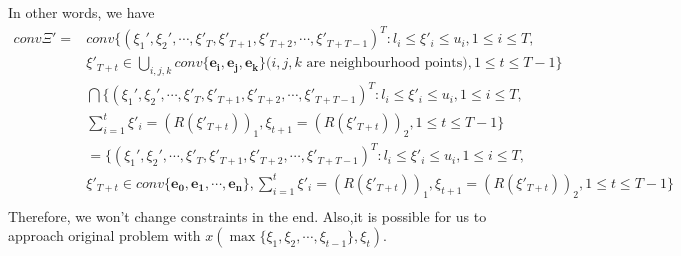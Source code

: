 \documentclass{article}
\begin{document}
In other words, we have
$$
\begin{array}{ll}
conv\Xi' = &conv\{(\xi_1',\xi_2',\cdots,\xi'_T,\xi'_{T+1},\xi'_{T+2},\cdots,\xi'_{T+T-1})^T:l_i\leq \xi'_i \leq u_i,1\leq i \leq T,\\
&\xi'_{T+t}\in \bigcup\limits_{i,j,k} conv\{\mathbf{e_i},\mathbf{e_j},\mathbf{e_k}\}\text{($i,j,k$ are neighbourhood points)},1\leq t\leq T-1\}\\
&\bigcap\{(\xi_1',\xi_2',\cdots,\xi'_T,\xi'_{T+1},\xi'_{T+2},\cdots,\xi'_{T+T-1})^T:l_i\leq \xi'_i \leq u_i,1\leq i \leq T,\\
&\sum\limits_{i=1}^t \xi'_i = (R(\xi'_{T+t}))_1,\xi_{t+1} = (R(\xi'_{T+t}))_2, 1\leq t\leq T-1 \}\\
& = \{(\xi_1',\xi_2',\cdots,\xi'_T,\xi'_{T+1},\xi'_{T+2},\cdots,\xi'_{T+T-1})^T:l_i\leq \xi'_i \leq u_i,1\leq i \leq T,\\
&\xi'_{T+t}\in conv\{\mathbf{e_0},\mathbf{e_1},\cdots,\mathbf{e_n}\},\sum\limits_{i=1}^t \xi'_i = (R(\xi'_{T+t}))_1,\xi_{t+1} = (R(\xi'_{T+t}))_2, 1\leq t\leq T-1 \}\\
\end{array}
$$
Therefore, we won't change constraints in the end.
Also,it is possible for us to approach original problem with $x(\max\{\xi_1,\xi_2,\cdots,\xi_{t-1}\},\xi_t)$.
\end{document}
